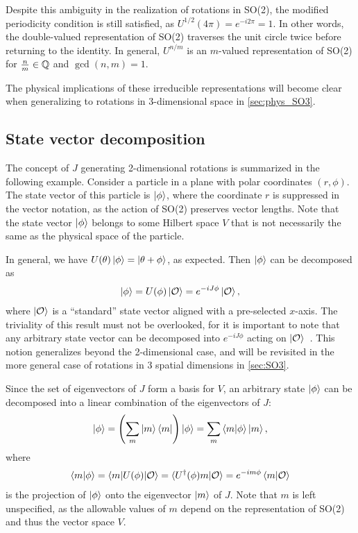Despite this ambiguity in the realization of rotations in SO(2), the modified periodicity condition is still satisfied, as $U^{1/2}(4\pi) = e^{-i2\pi} = 1$. In other words, the double-valued representation of SO(2) traverses the unit circle twice before returning to the identity. In general, $U^{n/m}$ is an $m$-valued representation of SO(2) for $\frac{n}{m}\in\mathbb{Q}$ and $\gcd(n,m)=1$.

The physical implications of these irreducible representations will become clear when generalizing to rotations in 3-dimensional space in \cref{sec:phys_SO3}.

\subsection{State vector decomposition}\label{sub:SO2_decomp}
The concept of $J$ generating 2-dimensional rotations is summarized in the following example. Consider a particle in a plane with polar coordinates $(r,\phi)$. The state vector of this particle is $\ket{\phi}$, where the coordinate $r$ is suppressed in the vector notation, as the action of SO(2) preserves vector lengths. Note that the state vector $\ket{\phi}$ belongs to some Hilbert space $V$ that is not necessarily the same as the physical space of the particle.

In general, we have $U(\theta)\ket{\phi} = \ket{\theta+\phi}$, as expected. Then $\ket{\phi}$ can be decomposed as
\begin{align*}
    \ket{\phi} = U(\phi)\ket{\mathcal{O}} = e^{-iJ\phi}\ket{\mathcal{O}},
\end{align*}
where $\ket{\mathcal{O}}$ is a ``standard'' state vector aligned with a pre-selected $x$-axis. The triviality of this result must not be overlooked, for it is important to note that any arbitrary state vector can be decomposed into $e^{-iJ\phi}$ acting on $\ket{\mathcal{O}}$~\cite{Tung1985}. This notion generalizes beyond the 2-dimensional case, and will be revisited in the more general case of rotations in 3 spatial dimensions in \cref{sec:SO3}.

Since the set of eigenvectors of $J$ form a basis for $V$, an arbitrary state $\ket{\phi}$ can be decomposed into a linear combination of the eigenvectors of $J$:
\begin{align*}
    \ket{\phi} = \left( \sum_{m} \ket{m}\bra{m} \right)\ket{\phi} = \sum_{m} \braket{m|\phi}\ket{m},
\end{align*}
where
\begin{align*}
    \braket{m|\phi} = \braket{m|U(\phi)|\mathcal{O}} = \braket{U^\dagger(\phi)m|\mathcal{O}} = e^{-im\phi}\braket{m|\mathcal{O}}
\end{align*}
is the projection of $\ket{\phi}$ onto the eigenvector $\ket{m}$ of $J$. Note that $m$ is left unspecified, as the allowable values of $m$ depend on the representation of SO(2) and thus the vector space $V$.

